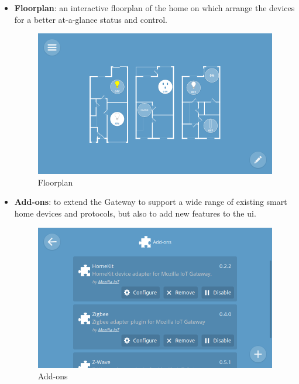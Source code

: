 \begin{itemize}
    \item \textbf{Floorplan}: an interactive floorplan of the home on which arrange the devices for a better at-a-glance status and control.
        \begin{figure}[H]
        \centering
        \includegraphics[scale=0.25]{images/webthings/floorplan_screenshot.png}
        \caption{Floorplan \cite{wtgateway}}
        \end{figure}

    \item \textbf{Add-ons}: to extend the Gateway to support a wide range of existing smart home devices and protocols, but also to add new features to the \gls{ui}.
        \begin{figure}[H]
        \centering
        \includegraphics[scale=0.25]{images/webthings/addons_screenshot.png}
        \caption{Add-ons \cite{wtabout}}
        \end{figure}
        
    \end{itemize}


